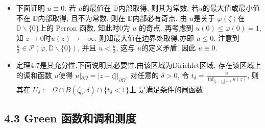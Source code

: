\begin{itemize}
    \item[4.2.1]

下面证明 $u\equiv 0$. 若 $u$的最值在 $\mathbb{D}$内部取得, 则其为常数; 
若$u$的最大值或最小值不在 $\mathbb{D}$内部取得, 且不为常数, 则在 $\mathbb{D}$内部必有奇点.
由 $u$是关于 $\varphi(\zeta)$在 $\mathbb{D}\backslash \{0\}$上的 Perron 函数, 
知此时$0$为 $u$ 的奇点. 再考虑到 $u(0)\le \varphi(0) =1$, 
知 $z\to 0$时$u(z)\to -\infty$.
 则知最大值在边界处取得,亦即 $u\le 0$.
 注意到 $\frac{u}{2} \in \mathcal{P}(\varphi,\mathbb{D}\backslash\{0\})$, 
 并且 $u<\frac{u}{2}$, 这与 $u$的定义矛盾. 因此 $u\equiv 0.$

    \item[4.2.2]

 定理4.7是其充分性,下面说明其必要性.由该区域为Dirichlet区域, 
 存在该区域上的调和函数 $u$使得 $u|_{\partial \Omega} = |z-\zeta|\big|_{\partial \Omega}$. 
 对任意的 $\delta>0$, 令 $t_\delta = \frac{u}{\inf_{|z-\zeta_0|=\delta}u(z)}$, 
 则其在 $U_{\delta}:=\Omega\cap B(\zeta_0,\delta)\cap\{t_{\delta}<1\}$上
 是满足条件的闸函数.
\end{itemize} 

 \subsection*{4.3 Green 函数和调和测度}

